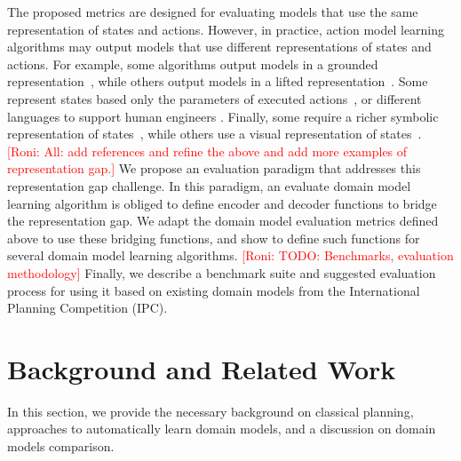 \documentclass{article}
\theoremstyle{definition}
\theoremstyle{remark}
\newcommand{\roni}[1]{{\textcolor{red}{[Roni: #1]}}}
\begin{document}
The proposed metrics are designed for evaluating models that use the same representation of states and actions. 
However, in practice, action model learning algorithms may output models that use different representations of states and actions. For example, some algorithms output models in a grounded representation~\citep{stern2017efficient}, while others output models in a lifted representation~\citep{juba2021safe,xi2024neuro,aineto2019learning}. Some represent states based only the parameters of executed actions~\citep{cresswell2011generalised}, or different languages to support human engineers \citep{mccluskey2010action}. Finally, some require a richer symbolic representation of states~\citep{juba2021safe}, while others use a visual representation of states~\citep{xi2024neuro}.
\roni{All: add references and refine the above and add more examples of representation gap.}
We propose an evaluation paradigm that addresses this representation gap challenge. 
In this paradigm, an evaluate domain model learning algorithm is obliged to define encoder and decoder functions to bridge the representation gap. 
We adapt the domain model evaluation metrics defined above to use these bridging functions, 
and show to define such functions for several domain model learning algorithms. 
\roni{TODO: Benchmarks, evaluation methodology}
Finally, we describe a benchmark suite and suggested evaluation process for using it based on existing domain models from the International Planning Competition (IPC).




\section{Background and Related Work}

In this section, we provide the necessary background on classical planning, approaches to automatically learn domain models, and a discussion on domain models comparison. 
\end{document}
